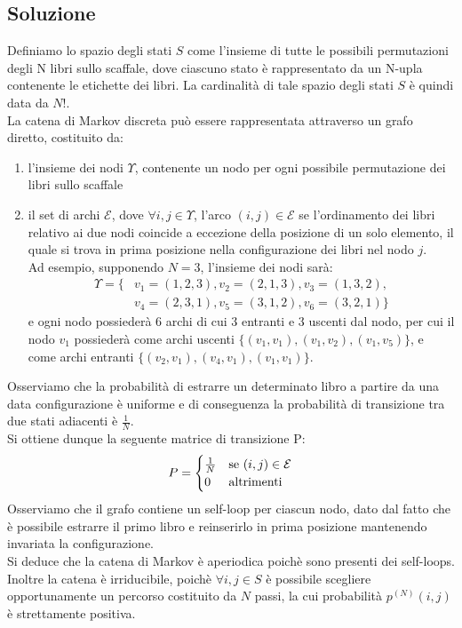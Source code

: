 \documentclass[
	12pt, %
]{fphw}
\begin{document}
\subsection*{Soluzione}
Definiamo lo spazio degli stati $S$ come l'insieme di tutte le possibili permutazioni degli N libri sullo scaffale, dove ciascuno stato è rappresentato da un N-upla contenente le etichette dei libri.
La cardinalità di tale spazio degli stati $S$ è quindi data da $N!$.\\
La catena di Markov discreta può essere rappresentata attraverso un grafo diretto, costituito da:
\begin{enumerate}
	\item l'insieme dei nodi $\Upsilon$, contenente un nodo per ogni possibile permutazione dei libri sullo scaffale
	\item il set di archi $\mathcal{E}$, dove $\forall i, j \in \Upsilon$, l'arco $(i,j) \in \mathcal{E}$ se l'ordinamento dei libri relativo ai due nodi coincide a eccezione della posizione di un solo elemento,
	il quale si trova in prima posizione nella configurazione dei libri nel nodo $j$.\\
	Ad esempio, supponendo $N = 3$, l'insieme dei nodi sarà:
	\begin{align*}
		\Upsilon = \{&v_1=(1,2,3), v_2=(2,1,3), v_3=(1,3,2), \\
			&v_4=(2,3,1), v_5=(3,1,2), v_6=(3,2,1)\}
	\end{align*}
	e ogni nodo possiederà $6$ archi di cui $3$ entranti e $3$ uscenti dal nodo, per cui il nodo $v_1$ possiederà come archi uscenti $\{(v_1,v_1), (v_1,v_2), (v_1,v_5)\}$,
	e come archi entranti $\{(v_2,v_1), (v_4,v_1), (v_1,v_1)\}$.
	
\end{enumerate}
Osserviamo che la probabilità di estrarre un determinato libro a partire da una data configurazione è uniforme e di conseguenza la probabilità di transizione tra due stati adiacenti è $\textstyle\frac{1}{N}$.\\
Si ottiene dunque la seguente matrice di transizione P:
\begin{equation*}
	P = \begin{cases} 
		\frac{1}{N} & \textnormal{se } (i,j)\in \mathcal{E}\\
		0 & \textnormal{altrimenti}
	\end{cases}
\end{equation*}
Osserviamo che il grafo contiene un self-loop per ciascun nodo, dato dal fatto che è possibile estrarre il primo libro e reinserirlo in prima posizione mantenendo invariata la configurazione.\\
Si deduce che la catena di Markov è aperiodica poichè sono presenti dei self-loops.\\
Inoltre la catena è irriducibile, poichè $ \forall i,j \in S$ è possibile scegliere opportunamente un percorso costituito da $N$ passi, la cui probabilità $p^{(N)}(i,j)$ è strettamente positiva.\\
\end{document}
